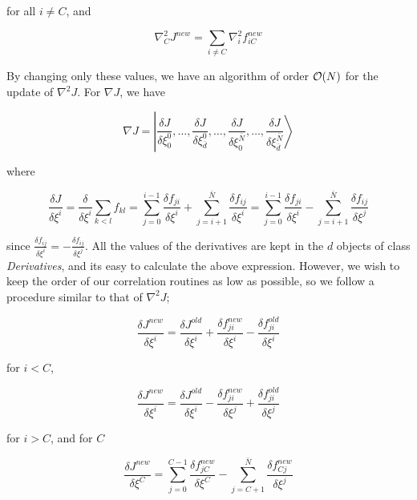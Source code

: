 for all $i\ne C$, and

\begin{equation}
  \nabla_C^2 J^{new} = \sum_{i \ne C} \nabla_i^2 f_{iC}^{new}
\end{equation}

By changing only these values, we have an algorithm of order ${\cal O}(N)$
for the update of $\nabla^2 J$. \newline
For $\nabla J$, we have

\begin{equation}
  \nabla J = \left| \frac{\delta J}{\delta \xi_0^0},
  \dots , \frac{\delta J}{\delta \xi_{\bar{d}}^0}, \dots,
  \frac{\delta J}{\delta \xi_0^{\bar{N}}}, \dots, \frac{\delta J}{\delta
  \xi_{\bar{d}}^{\bar{N}}} \right>
\end{equation}

where

\begin{equation}
  \frac{\delta J}{\delta \xi^i} = \frac{\delta}{\delta \xi^i}
  \sum_{k<l} f_{kl} = \sum_{j=0}^{i-1} \frac{\delta f_{ji}}{\delta
  \xi^i}  + \sum_{j=i+1}^{\bar{N}} \frac{\delta f_{ij}}{\delta \xi^i} 
  = \sum_{j=0}^{i-1} \frac{\delta f_{ji}}{\delta
  \xi^i}  - \sum_{j=i+1}^{\bar{N}} \frac{\delta f_{ij}}{\delta \xi^j}
\end{equation}

since $\frac{\delta f_{ij}}{\delta \xi^i} = - \frac{\delta
  f_{ij}}{\delta \xi^j}$. 
All the values of the derivatives are kept
in the $d$ objects of class \emph{Derivatives}, and its easy to
calculate the above expression. However, we wish to keep the order of
our correlation routines as low as possible, so we follow a procedure
similar to that of $\nabla^2 J$;

\begin{equation}
  \frac{\delta J^{new}}{\delta \xi^i} = \frac{\delta J^{old}}{\delta
  \xi^i} + \frac{\delta f_{ji}^{new}}{\delta \xi^i} - \frac{\delta
  f_{ji}^{old}}{\delta \xi^i} 
\end{equation} 

for $i<C$,

\begin{equation}
  \frac{\delta J^{new}}{\delta \xi^i} = \frac{\delta J^{old}}{\delta
  \xi^i} - \frac{\delta f_{ji}^{new}}{\delta \xi^j} + \frac{\delta
  f_{ji}^{old}}{\delta \xi^j} 
\end{equation} 

for $i>C$, and for $C$

\begin{equation}
  \frac{\delta J^{new}}{\delta \xi^C} 
  = \sum_{j=0}^{C-1} \frac{\delta f_{jC}^{new}}{\delta
  \xi^C}  - \sum_{j=C+1}^{\bar{N}} \frac{\delta f_{Cj}^{new}}{\delta \xi^j}
\end{equation}

